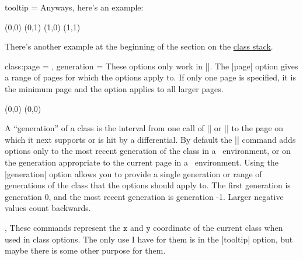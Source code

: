 \begin{sseqdata}[name = basic, cohomological Serre grading]
\begin{key}{tooltip = }
Anyways, here's an example:
\begin{codeexample}[]
\begin{sseqpage}[classes = {tooltip = {(\xcoord,\ycoord)}}]
\class(0,0)
\class(0,1)
\class(1,0)
\class(1,1)
\end{sseqpage}
\end{codeexample}

There's another example at the beginning of the section on the
\hyperref[sec:class stack]{class stack}.
\end{key}

\begin{keylist}{
    class:page = ,
    generation = 
}
\def\classpagehandler#1#2{\textcolor{keycolor}{\noligs{#2}}}
These options only work in |\classoptions|. The |page| option gives a range of
pages for which the options apply to. If only one page is specified, it is the
minimum page and the option applies to all larger pages.
\begin{codeexample}[width = 6cm]
\begin{sseqdata}[ name = page_example, no axes,
    title = \page, title style = {yshift = -0.5cm} ]
\class(0,0)
\classoptions[class:page = 2 -- 3, fill, blue](0,0)
\end{sseqdata}

\printpage[ name = page_example, page = 1 ] \qquad
\printpage[ name = page_example, page = 2 ] \qquad
\printpage[ name = page_example, page = 4 ]
\end{codeexample}
A ``generation'' of a class is the interval from one call of |\class| or
|\replaceclass| to the page on which it next supports or is hit by a
differential. By default the |\classoptions| command adds options only to the
most recent generation of the class in a \sseqdataenv\  environment, or on the
generation appropriate to the current page in a \sseqpageenv\  environment.
Using the |generation| option allows you to provide a single generation or range
of generations of the class that the options should apply to. The first
generation is generation 0, and the most recent generation is generation -1.
Larger negative values count backwards.
\codeexample[from file=class-page2a]
\codeexample[from file=class-page2b]
\end{keylist}

\begin{commandlist}{\xcoord,\ycoord}
These commands represent the $\mathtt{x}$ and $\mathtt{y}$ coordinate of the
current class when used in class options. The only use I have for them is in the
|tooltip| option, but maybe there is some other purpose for them.
\end{commandlist}



\end{sseqdata}
